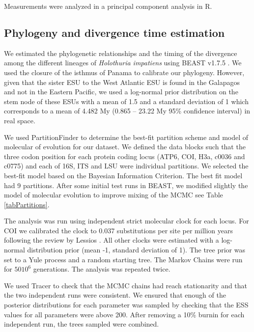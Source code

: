 \documentclass{article}\usepackage[]{graphicx}\usepackage[]{color}
\begin{document}
Measurements were analyzed in a principal component analysis in R.

\subsection{Phylogeny and divergence time estimation}

We estimated the phylogenetic relationships and the timing of the divergence
among the different lineages of \textit{Holothuria impatiens} using BEAST v1.7.5
\cite{}. We used the closure of the isthmus of Panama to calibrate our
phylogeny. However, given that the sister ESU to the West Atlantic ESU is found
in the Galapagos and not in the Eastern Pacific, we used a log-normal prior
distribution on the stem node of these ESUs with a mean of 1.5 and a standard
deviation of 1 which corresponds to a mean of 4.482 My (0.865 -- 23.22 My 95\%
confidence interval) in real space.

We used PartitionFinder \cite{} to determine the best-fit partition scheme and
model of molecular of evolution for our dataset. We defined the data blocks such
that the three codon position for each protein coding locus (ATP6, COI, H3a,
c0036 and c0775) and each of 16S, ITS and LSU were individual partitions. We
selected the best-fit model based on the Bayesian Information Criterion. The
best fit model had 9 partitions. After some initial test runs in BEAST, we
modified slightly the model of molecular evolution to improve mixing of the MCMC
see Table \ref{tabPartitions}.

The analysis was run using independent strict molecular clock for each
locus. For COI we calibrated the clock to 0.037 substitutions per site per
million years following the review by Lessios \cite{Lessios2008}. All other
clocks were estimated with a log-normal distribution prior (mean -1, standard
deviation of 1). The tree prior was set to a Yule process and a random starting
tree. The Markov Chains were run for $50 10^6$ generations. The analysis was
repeated twice.

We used Tracer \cite{} to check that the MCMC chains had reach stationarity and
that the two independent runs were consistent. We ensured that enough of the posterior
distributions for each parameter was sampled by checking that the ESS values for
all parameters were above 200. After removing a 10\% burnin for each independent
run, the trees sampled were combined.
\end{document}
